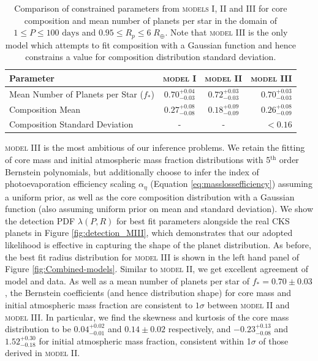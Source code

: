 \documentclass[fleqn,usenatbib]{mnras}
\begin{document}
\begin{table}
	\centering
	\def\arraystretch{1.5}
	\begin{tabular}{ lccr } 
		\hline
		Parameter & \textsc{model I} & \textsc{model II} & \textsc{model III}\\
		\hline\hline
		Mean Number of Planets per Star ($f_*$)  & $0.70^{+0.04}_{-0.03}$ & $0.72^{+0.03}_{-0.03}$ & $0.70^{+0.03}_{-0.03}$\\
		Composition Mean & $0.27^{+0.08}_{-0.08}$ & $0.18^{+0.09}_{-0.09}$ & $0.26^{+0.08}_{-0.09}$\\
		Composition Standard Deviation & - & - & $<0.16$\\
		\hline
	\end{tabular}
	\caption{Comparison of constrained parameters from \textsc{models I, II} and \textsc{III} for core composition and mean number of planets per star in the domain of $1\leq P \leq 100 \text{ days}$ and $0.95 \leq R_p \leq 6 \; R_\oplus$. Note that \textsc{model III} is the only model which attempts to fit composition with a Gaussian function and hence constrains a value for composition distribution standard deviation.}
	\label{tab:models}
\end{table}


\textsc{model III} is the most ambitious of our inference problems. We retain the fitting of core mass and initial atmospheric mass fraction distributions with 5$^\text{th}$ order Bernstein polynomials, but additionally choose to infer the index of photoevaporation efficiency scaling $\alpha_\eta$ (Equation \ref{eq:masslossefficiency}) assuming a uniform prior, as well as the core composition distribution with a Gaussian function (also assuming uniform prior on mean and standard deviation). We show the detection PDF $\lambda(P,R)$ for best fit parameters alongside the real CKS planets in Figure \ref{fig:detection_MIII}, which demonstrates that our adopted likelihood is effective in capturing the shape of the planet distribution. As before, the best fit radius distribution for \textsc{model III} is shown in the left hand panel of Figure \ref{fig:Combined-models}. Similar to \textsc{model II}, we get excellent agreement of model and data. As well as a mean number of planets per star of $f_* = 0.70\pm0.03$, the Bernstein coefficients (and hence distribution shape) for core mass and initial atmospheric mass fraction are consistent to $1\sigma$ between \textsc{model II} and \textsc{model III}. In particular, we find the skewness and kurtosis of the core mass distribution to be $0.04^{+0.02}_{-0.01}$ and $0.14\pm0.02$ respectively, and $-0.23^{+0.13}_{-0.08}$ and $1.52^{+0.30}_{-0.18}$ for initial atmospheric mass fraction, consistent within 1$\sigma$ of those derived in \textsc{model II}.
\end{document}

